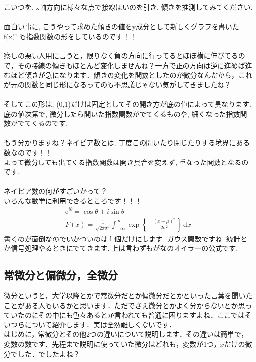 \documentclass[11pt,a4paper]{jreport}
\begin{document}
こいつを, x軸方向に様々な点で接線ぽいのを引き, 傾きを推測してみてください. \\
\\
面白い事に, こうやって求めた傾きの値をy成分として新しくグラフを書いた f(x)' も指数関数の形をしているのです！！\\
\\
察しの悪い人用に言うと，限りなく負の方向に行ってるとほぼ横に伸びてるので，その接線の傾きもほとんど変化しませんね？一方で正の方向は逆に進めば進むほど傾きが急になります．傾きの変化を関数としたのが微分なんだから，これが元の関数と同じ形になるってのも不思議じゃない気がしてきましたね？\\
\\
そしてこの形は, (0,1)だけは固定としてその開き方が底の値によって異なります. \\
底の値次第で, 微分したら開いた指数関数がでてくるものや, 細くなった指数関数がでてくるのです.\\
\\
もう分かりますね？ネイピア数とは, 丁度この開いたり閉じたりする境界にある数なのです！！\\
よって微分しても出てくる指数関数は開き具合を変えず, 重なった関数となるのです.\\
\\
ネイピア数の何がすごいかって？\\
いろんな数学に利用できるところです！！！\\
\begin{eqnarray}
\mathrm{e}^{i\theta} = \cos\theta + i\sin\theta \\
F(x)=\frac{1}{\sqrt{2\pi \sigma^2}}\int_{-\infty}^{\infty}\exp{\left\{-\frac{(x-\mu)^2}{2\sigma^2}\right\}}\ \mathrm{d}x
\end{eqnarray}
書くのが面倒なのでいかついのは１個だけにします. ガウス関数ですね. 統計とか信号処理やるときにでてきます. 上は言わずもがなのオイラーの公式です.\\

\subsection{常微分と偏微分，全微分}
微分というと，大学以降とかで常微分だとか偏微分だとかといった言葉を聞いたことがある人もいるかと思います．ただでさえ微分とかよく分からないとか思っていたのにその中にも色々あるとか言われても普通に困りますよね．ここではそいつらについて紹介します．実は全然難しくないです．\\

はじめに，常微分とその他2つの違いについて説明します．その違いは簡単で，変数の数です．先程まで説明に使っていた微分はどれも，変数が1つ，$x$だけの微分でした．でしたよね？
\end{document}
